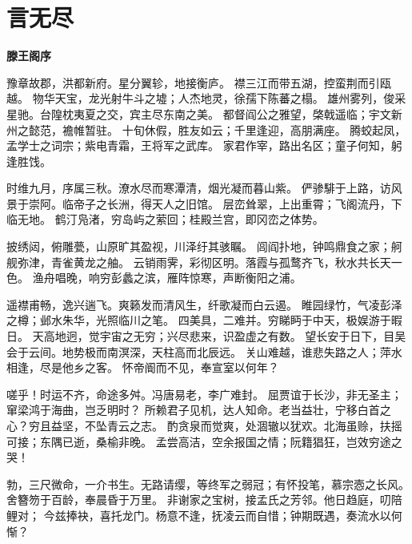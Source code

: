 \documentclass[UTF8,oneside]{ctexbook}
\begin{document}






\section{言无尽}
\mfApache \quad \quad\quad\quad\quad \quad\quad\quad \quad\quad\textbf{滕王阁序}

豫章故郡，洪都新府。星分翼轸，地接衡庐。
襟三江而带五湖，控蛮荆而引瓯越。
物华天宝，龙光射牛斗之墟；人杰地灵，徐孺下陈蕃之榻。
雄州雾列，俊采星驰。台隍枕夷夏之交，宾主尽东南之美。
都督阎公之雅望，棨戟遥临；宇文新州之懿范，襜帷暂驻。
十旬休假，胜友如云；千里逢迎，高朋满座。
腾蛟起凤，孟学士之词宗；紫电青霜，王将军之武库。
家君作宰，路出名区；童子何知，躬逢胜饯。

时维九月，序属三秋。潦水尽而寒潭清，烟光凝而暮山紫。
俨骖騑于上路，访风景于崇阿。临帝子之长洲，得天人之旧馆。
层峦耸翠，上出重霄；飞阁流丹，下临无地。
鹤汀凫渚，穷岛屿之萦回；桂殿兰宫，即冈峦之体势。

披绣闼，俯雕甍，山原旷其盈视，川泽纡其骇瞩。
闾阎扑地，钟鸣鼎食之家；舸舰弥津，青雀黄龙之舳。
云销雨霁，彩彻区明。落霞与孤鹜齐飞，秋水共长天一色。
渔舟唱晚，响穷彭蠡之滨，雁阵惊寒，声断衡阳之浦。

遥襟甫畅，逸兴遄飞。爽籁发而清风生，纤歌凝而白云遏。
睢园绿竹，气凌彭泽之樽；邺水朱华，光照临川之笔。
四美具，二难并。穷睇眄于中天，极娱游于暇日。
天高地迥，觉宇宙之无穷；兴尽悲来，识盈虚之有数。
望长安于日下，目吴会于云间。地势极而南溟深，天柱高而北辰远。
关山难越，谁悲失路之人；萍水相逢，尽是他乡之客。
怀帝阍而不见，奉宣室以何年？

嗟乎！时运不齐，命途多舛。冯唐易老，李广难封。
屈贾谊于长沙，非无圣主；窜梁鸿于海曲，岂乏明时？
所赖君子见机，达人知命。老当益壮，宁移白首之心？穷且益坚，不坠青云之志。
酌贪泉而觉爽，处涸辙以犹欢。北海虽赊，扶摇可接；东隅已逝，桑榆非晚。
孟尝高洁，空余报国之情；阮籍猖狂，岂效穷途之哭！

勃，三尺微命，一介书生。无路请缨，等终军之弱冠；有怀投笔，慕宗悫之长风。
舍簪笏于百龄，奉晨昏于万里。
非谢家之宝树，接孟氏之芳邻。他日趋庭，叨陪鲤对；
今兹捧袂，喜托龙门。杨意不逢，抚凌云而自惜；钟期既遇，奏流水以何惭？
\end{document}
